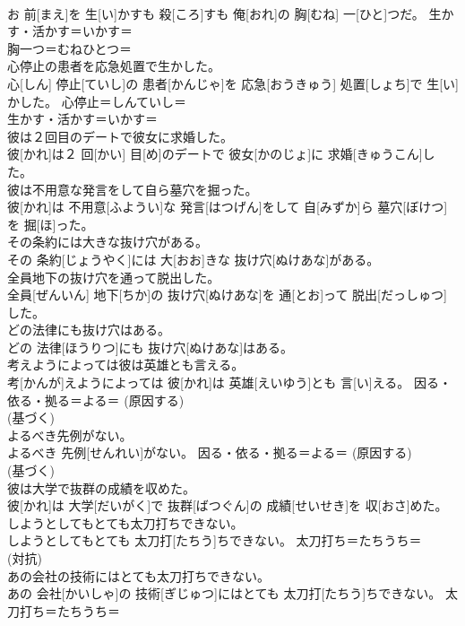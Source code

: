 \documentclass[8pt]{extreport}
\begin{document}
\begin{CJK}{UTF8}{min}
{\\	お 前[まえ]を 生[い]かすも 殺[ころ]すも 俺[おれ]の 胸[むね] 一[ひと]つだ。	生かす・活かす＝いかす＝ 
\\	胸一つ＝むねひとつ＝ 
\\	心停止の患者を応急処置で生かした。	
\\	心[しん] 停止[ていし]の 患者[かんじゃ]を 応急[おうきゅう] 処置[しょち]で 生[い]かした。	心停止＝しんていし＝ 
\\	生かす・活かす＝いかす＝ 
\\	彼は２回目のデートで彼女に求婚した。	
\\	彼[かれ]は２ 回[かい] 目[め]のデートで 彼女[かのじょ]に 求婚[きゅうこん]した。	
\\	彼は不用意な発言をして自ら墓穴を掘った。	
\\	彼[かれ]は 不用意[ふようい]な 発言[はつげん]をして 自[みずか]ら 墓穴[ぼけつ]を 掘[ほ]った。	
\\	その条約には大きな抜け穴がある。	
\\	その 条約[じょうやく]には 大[おお]きな 抜け穴[ぬけあな]がある。	
\\	全員地下の抜け穴を通って脱出した。	
\\	全員[ぜんいん] 地下[ちか]の 抜け穴[ぬけあな]を 通[とお]って 脱出[だっしゅつ]した。	
\\	どの法律にも抜け穴はある。	
\\	どの 法律[ほうりつ]にも 抜け穴[ぬけあな]はある。	
\\	考えようによっては彼は英雄とも言える。	
\\	考[かんが]えようによっては 彼[かれ]は 英雄[えいゆう]とも 言[い]える。	因る・依る・拠る＝よる＝ (原因する) 
\\	(基づく) 
\\	よるべき先例がない。	
\\	よるべき 先例[せんれい]がない。	因る・依る・拠る＝よる＝ (原因する) 
\\	(基づく) 
\\	彼は大学で抜群の成績を収めた。	
\\	彼[かれ]は 大学[だいがく]で 抜群[ばつぐん]の 成績[せいせき]を 収[おさ]めた。	
\\	しようとしてもとても太刀打ちできない。	
\\	しようとしてもとても 太刀打[たちう]ちできない。	太刀打ち＝たちうち＝ 
\\	(対抗) 
\\	あの会社の技術にはとても太刀打ちできない。	
\\	あの 会社[かいしゃ]の 技術[ぎじゅつ]にはとても 太刀打[たちう]ちできない。	太刀打ち＝たちうち＝ 
}
\end{CJK}
\end{document}
